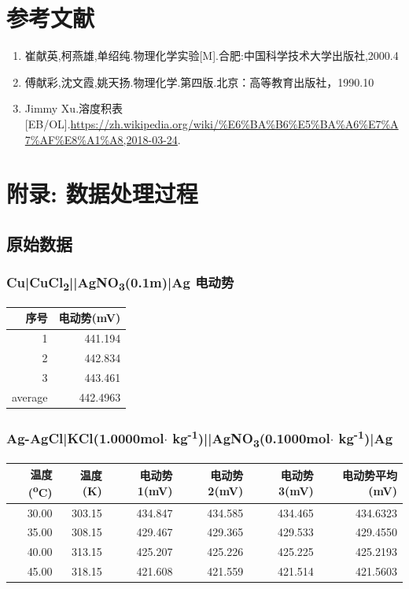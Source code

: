 \documentclass[11pt]{report}
\begin{document}
\part{参考文献}
\label{sec:org2b11ab2}
\begin{enumerate}
\item 崔献英,柯燕雄,单绍纯.物理化学实验[M].合肥:中国科学技术大学出版社,2000.4
\item 傅献彩,沈文霞,姚天扬.物理化学.第四版.北京：高等教育出版社，1990.10
\item Jimmy Xu.溶度积表[EB/OL].\url{https://zh.wikipedia.org/wiki/\%E6\%BA\%B6\%E5\%BA\%A6\%E7\%A7\%AF\%E8\%A1\%A8,2018-03-24}.
\end{enumerate}

\part{附录: 数据处理过程}
\label{sec:org5997ccc}
\chapter{原始数据}
\label{sec:org6198c13}
\section{Cu|CuCl\textsubscript{2}||AgNO\textsubscript{3}(0.1m)|Ag 电动势}
\label{sec:org15be027}

\begin{center}
\begin{tabular}{rr}
序号 & 电动势(mV)\\
\hline
1 & 441.194\\
2 & 442.834\\
3 & 443.461\\
\hline
average & 442.4963\\
\end{tabular}
\end{center}
\section{Ag-AgCl|KCl(1.0000mol\(\cdot\) kg\textsuperscript{-1})||AgNO\textsubscript{3}(0.1000mol\(\cdot\) kg\textsuperscript{-1})|Ag}
\label{sec:org265b881}

\begin{center}
\begin{tabular}{rrrrrr}
温度(\textsuperscript{o}C) & 温度(K) & 电动势1(mV) & 电动势2(mV) & 电动势3(mV) & 电动势平均(mV)\\
\hline
30.00 & 303.15 & 434.847 & 434.585 & 434.465 & 434.6323\\
35.00 & 308.15 & 429.467 & 429.365 & 429.533 & 429.4550\\
40.00 & 313.15 & 425.207 & 425.226 & 425.225 & 425.2193\\
45.00 & 318.15 & 421.608 & 421.559 & 421.514 & 421.5603\\
\end{tabular}
\end{center}
\end{document}
